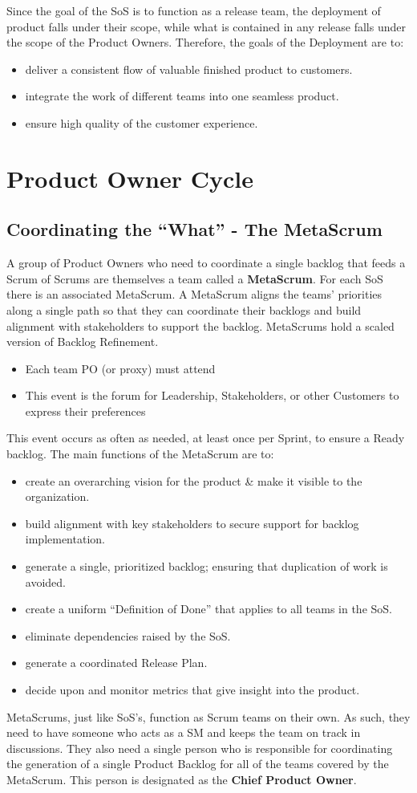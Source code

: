 \documentclass[12pt,a4paper,parskip=full]{scrartcl}
\begin{document}
Since the goal of the SoS is to function as a release team, the deployment
of product falls under their scope, while what is contained in any release
falls under the scope of the Product Owners. Therefore, the goals of the
Deployment are to:
\begin{itemize}
\item deliver a consistent flow of valuable finished product to customers.
\item integrate the work of different teams into one seamless product.
\item ensure high quality of the customer experience.
\end{itemize}

\section{Product Owner Cycle}
\subsection{Coordinating the ``What'' - The MetaScrum}
A group of Product Owners who need to coordinate a single backlog that
feeds a Scrum of Scrums are themselves a team called a \textbf{MetaScrum}.
For each SoS there is an associated MetaScrum. A MetaScrum aligns the
teams' priorities along a single path so that they can coordinate their
backlogs and build alignment with stakeholders to support the backlog.
MetaScrums hold a scaled version of Backlog Refinement.
\begin{itemize}
\item Each team PO (or proxy) must attend
\item This event is the forum for Leadership, Stakeholders, or other
Customers to express their preferences
\end{itemize}
This event occurs as often as needed, at least once per Sprint, to ensure a
Ready backlog. The main functions of the MetaScrum are to:
\begin{itemize}
\item create an overarching vision for the product \& make it visible to
the organization.
\item build alignment with key stakeholders to secure support for backlog
implementation.
\item generate a single, prioritized backlog; ensuring that duplication of
work is avoided.
\item create a uniform ``Definition of Done'' that applies to all teams in
the SoS.
\item eliminate dependencies raised by the SoS.
\item generate a coordinated Release Plan.
\item decide upon and monitor metrics that give insight into the product.
\end{itemize}
MetaScrums, just like SoS's, function as Scrum teams on their own. As such,
they need to have someone who acts as a SM and keeps the team on track in
discussions. They also need a single person who is responsible for coordinating the
generation of a single Product Backlog for all of the teams covered by the
MetaScrum. This person is designated as the \textbf{Chief Product Owner}.
\end{document}
